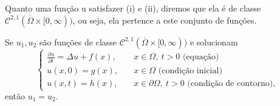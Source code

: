 \documentclass[../pde_notes.tex]{subfiles}
\begin{document}
Quanto uma função u satisfazer (i) e (ii), diremos que ela é de classe \(\mathcal{C}^{2, 1}(\overline{\Omega }\times [0, \infty))\), ou seja, ela pertence a este conjunto de funções.

\begin{prop*}
	Se \(u_{1}, u_{2}\) são funções de classe \(\mathcal{C}^{2, 1}(\overline{\Omega }\times [0, \infty))\) e solucionam
	\[
		\left\{\begin{array}{ll}
			\frac{\partial^{}u}{\partial t^{}} = \Delta u + f(x), & \quad x\in \Omega ,\: t > 0\text{ (equação)}                       \\
			u(x, 0) = g(x),                                       & \quad x\in \Omega\text{ (condição inicial)}                        \\
			u(x, t) = h(x),                                       & \quad x\in \partial\Omega,\: t > 0\text{ (condição de contorno)} ,
		\end{array}\right.
	\]
	então \(u_{1} = u_{2}\).
\end{prop*}
\end{document}

